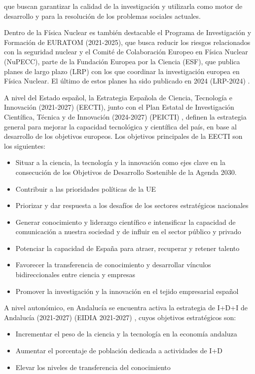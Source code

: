 \documentclass[a4paper,12pt,twoside]{article}
\begin{document}
que buscan garantizar la calidad de la investigación y utilizarla como motor de desarrollo y para la resolución de los problemas sociales actuales.

Dentro de la Física Nuclear es también destacable el Programa de Investigación y Formación de
EURATOM (2021-2025), que busca reducir los riesgos relacionados con la seguridad nuclear y el Comité de Colaboración Europeo en Física Nuclear (NuPECC), parte de la Fundación Europea por la Ciencia (ESF), que publica planes de largo plazo (LRP) con los que coordinar la investigación europea en Física Nuclear. El último de estos planes ha sido publicado en 2024  (LRP-2024) \cite{nupecc}.

A nivel del Estado español, la Estrategia Española de Ciencia, Tecnología e Innovación (2021-2027) (EECTI)\cite{eecti}, junto con el Plan Estatal de Investigación
Científica, Técnica y de Innovación (2024-2027) (PEICTI) \cite{peicti}, definen la estrategia general para mejorar la capacidad tecnológica y científica del país, en base al desarrollo de los objetivos europeos. Los objetivos principales de la EECTI son los siguientes:

\begin{itemize}
\item Situar a la ciencia, la tecnología y la innovación como ejes clave en la consecución de los Objetivos de Desarrollo Sostenible de la Agenda 2030.
\item Contribuir a las prioridades políticas de la UE
\item Priorizar y dar respuesta a los desafíos de los sectores estratégicos nacionales
\item Generar conocimiento y liderazgo científico e intensificar la capacidad de comunicación a nuestra sociedad y de influir en el sector público y privado
\item Potenciar la capacidad de España para atraer, recuperar y retener talento
\item Favorecer la transferencia de conocimiento y desarrollar vínculos bidireccionales entre
ciencia y empresas
\item Promover la investigación y la innovación en el tejido empresarial español
\end{itemize}

A nivel autonómico, en Andalucía se encuentra activa la estrategia de I+D+I de Andalucía (2021-2027) (EIDIA 2021-2027) \cite{eidia}, cuyos objetivos estratégicos son:

\begin{itemize}
\item Incrementar el peso de la ciencia y la tecnología en la economía andaluza
\item Aumentar el porcentaje de población dedicada a actividades de I+D
\item Elevar los niveles de transferencia del conocimiento
\end{itemize}
\end{document}

